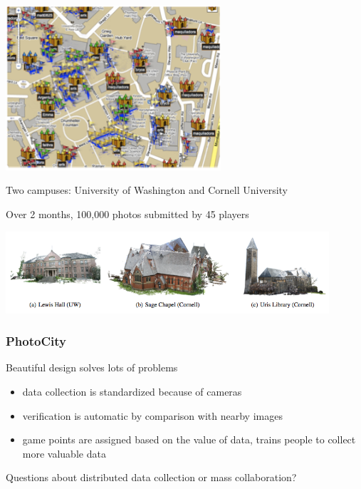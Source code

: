 \documentclass[aspectratio=169]{beamer}
\begin{document}
\begin{frame}

\begin{center}
\includegraphics[width=0.6\textwidth]{figures/tuite_photocity_2011_fig2}
\end{center}

Two campuses: University of Washington and Cornell University

\end{frame}
\begin{frame}

Over 2 months, 100,000 photos submitted by 45 players
\vfill
\begin{center}
\includegraphics[width=0.9\textwidth]{figures/tuite_photocity_2011_fig8}
\end{center}

\end{frame}
\begin{frame}
\frametitle{PhotoCity}

Beautiful design solves lots of problems
\pause
\begin{itemize}
\item data collection is standardized because of cameras
\pause
\item verification is automatic by comparison with nearby images
\pause
\item game points are assigned based on the value of data, trains people to collect more valuable data
\end{itemize}

\end{frame}
\begin{frame}

{\Large
\begin{center}
Questions about distributed data collection or mass collaboration?
\end{center}
}

\end{frame}
\end{document}
